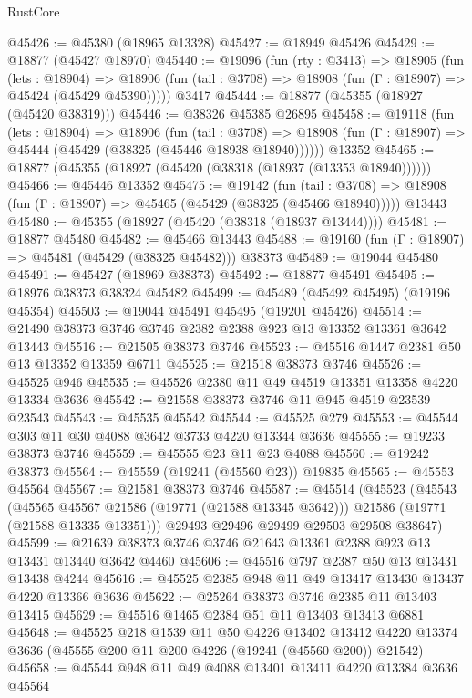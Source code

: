 \begin{lexlean}{RustCore}
\begin{coremodule}
@45426 := @45380 (@18965 @13328)
@45427 := @18949 @45426
@45429 := @18877 (@45427 @18970)
@45440 := @19096
    (fun (rty : @3413) =>
    @18905
      (fun (lets : @18904) =>
      @18906 (fun (tail : @3708) => @18908 (fun (Γ : @18907) => @45424 (@45429 @45390)))))
    @3417
@45444 := @18877 (@45355 (@18927 (@45420 @38319)))
@45446 := @38326 @45385 @26895
@45458 := @19118
    (fun (lets : @18904) =>
    @18906
      (fun (tail : @3708) =>
      @18908 (fun (Γ : @18907) => @45444 (@45429 (@38325 (@45446 @18938 @18940))))))
    @13352
@45465 := @18877 (@45355 (@18927 (@45420 (@38318 (@18937 (@13353 @18940))))))
@45466 := @45446 @13352
@45475 := @19142
    (fun (tail : @3708) => @18908 (fun (Γ : @18907) => @45465 (@45429 (@38325 (@45466 @18940)))))
    @13443
@45480 := @45355 (@18927 (@45420 (@38318 (@18937 @13444))))
@45481 := @18877 @45480
@45482 := @45466 @13443
@45488 := @19160 (fun (Γ : @18907) => @45481 (@45429 (@38325 @45482))) @38373
@45489 := @19044 @45480
@45491 := @45427 (@18969 @38373)
@45492 := @18877 @45491
@45495 := @18976 @38373 @38324 @45482
@45499 := @45489 (@45492 @45495) (@19196 @45354)
@45503 := @19044 @45491 @45495 (@19201 @45426)
@45514 := @21490 @38373 @3746 @3746 @2382 @2388 @923 @13 @13352 @13361 @3642 @13443
@45516 := @21505 @38373 @3746
@45523 := @45516 @1447 @2381 @50 @13 @13352 @13359 @6711
@45525 := @21518 @38373 @3746
@45526 := @45525 @946
@45535 := @45526 @2380 @11 @49 @4519 @13351 @13358 @4220 @13334 @3636
@45542 := @21558 @38373 @3746 @11 @945 @4519 @23539 @23543
@45543 := @45535 @45542
@45544 := @45525 @279
@45553 := @45544 @303 @11 @30 @4088 @3642 @3733 @4220 @13344 @3636
@45555 := @19233 @38373 @3746
@45559 := @45555 @23 @11 @23 @4088
@45560 := @19242 @38373
@45564 := @45559 (@19241 (@45560 @23)) @19835
@45565 := @45553 @45564
@45567 := @21581 @38373 @3746
@45587 := @45514
    (@45523
      (@45543
        (@45565 @45567 @21586 (@19771 (@21588 @13345 @3642)))
        @21586
        (@19771 (@21588 @13335 @13351)))
      @29493
      @29496
      @29499
      @29503
      @29508
      @38647)
@45599 := @21639 @38373 @3746 @3746 @21643 @13361 @2388 @923 @13 @13431 @13440 @3642 @4460
@45606 := @45516 @797 @2387 @50 @13 @13431 @13438 @4244
@45616 := @45525 @2385 @948 @11 @49 @13417 @13430 @13437 @4220 @13366 @3636
@45622 := @25264 @38373 @3746 @2385 @11 @13403 @13415
@45629 := @45516 @1465 @2384 @51 @11 @13403 @13413 @6881
@45648 := @45525
    @218
    @1539
    @11
    @50
    @4226
    @13402
    @13412
    @4220
    @13374
    @3636
    (@45555 @200 @11 @200 @4226 (@19241 (@45560 @200)) @21542)
@45658 := @45544 @948 @11 @49 @4088 @13401 @13411 @4220 @13384 @3636 @45564

\end{coremodule}
\end{lexlean}
